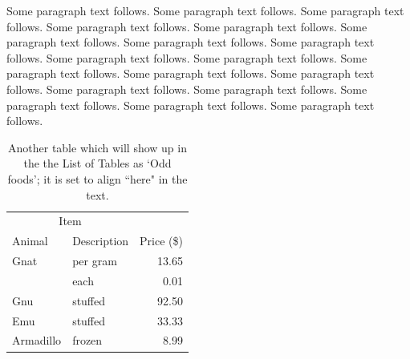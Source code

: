 Some paragraph text follows. Some paragraph text follows. Some paragraph text follows. Some paragraph text follows. Some paragraph text follows. Some paragraph text follows. Some paragraph text follows. Some paragraph text follows. Some paragraph text follows. Some paragraph text follows. Some paragraph text follows. Some paragraph text follows. Some paragraph text follows. Some paragraph text follows. Some paragraph text follows. Some paragraph text follows. Some paragraph text follows. Some paragraph text follows. 

\begin{table}[h]
	\centering
	\begin{tabular}{llr}
	\hline
	\multicolumn{2}{c}{Item} \\
	\cline{1-2}
	Animal & Description & Price (\$) \\
	\hline
	Gnat  & per gram & 13.65 \\
	 & each     &  0.01 \\
	Gnu   & stuffed  & 92.50 \\
	Emu   & stuffed  & 33.33 \\
	Armadillo & frozen & 8.99 \\
	\hline
	\end{tabular}
	\caption[Odd foods]{Another table which will show up in the the List of Tables as `Odd foods'; it is set to align ``here" in the text.}
\end{table}



